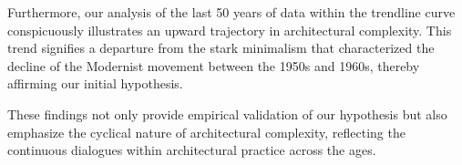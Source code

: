 Furthermore, our analysis of the last 50 years of data within the trendline curve conspicuously illustrates an upward trajectory in architectural complexity.
This trend signifies a departure from the stark minimalism that characterized the decline of the Modernist movement between the 1950s and 1960s, thereby affirming our initial hypothesis.

These findings not only provide empirical validation of our hypothesis but also emphasize the cyclical nature of architectural complexity, reflecting the continuous dialogues within architectural practice across the ages.









